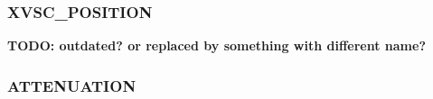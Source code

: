 \documentclass[a4paper,11pt,pdftex,twoside]{scrartcl}
\renewcommand{\bf}{\normalfont \bfseries}
\begin{document}
{{{\subsubsection{XVSC\_POSITION}
\label{subsec_xvsc_position}

{\bf TODO: outdated? or replaced by something with different name?}

%


\subsubsection{ATTENUATION}
\label{subsec_attenuation}

}}}
\end{document}

